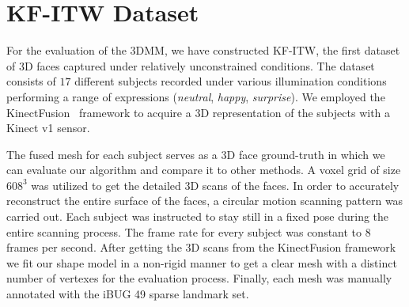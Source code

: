 %
\section{KF-ITW Dataset}
\label{sec:dataset}

For the evaluation of the 3DMM, we have constructed KF-ITW, the first dataset of 3D faces captured under relatively unconstrained conditions. The dataset consists of $17$ different subjects recorded under various illumination conditions performing a range of expressions (\emph{neutral}, \emph{happy}, \emph{surprise}).
We employed the KinectFusion~\cite{izadi2011kinectfusion,newcombe2011kinectfusion} framework to acquire a 3D representation of the subjects with a Kinect v1 sensor.

The fused mesh for each subject serves as a 3D face ground-truth in which we can evaluate our algorithm and compare it to other methods.
A voxel grid of size $608^3$ was utilized to get the detailed 3D scans of the faces.
In order to accurately reconstruct the entire surface of the faces, a circular motion scanning pattern was carried out. Each subject was instructed to stay still in a fixed pose during the entire scanning process. The frame rate for every subject was constant to $8$ frames per second. After getting the 3D scans from the KinectFusion framework we fit our shape model in a non-rigid manner to get a clear mesh with a distinct number of vertexes for the evaluation process. Finally, each mesh was manually annotated with the iBUG 49 sparse landmark set.
